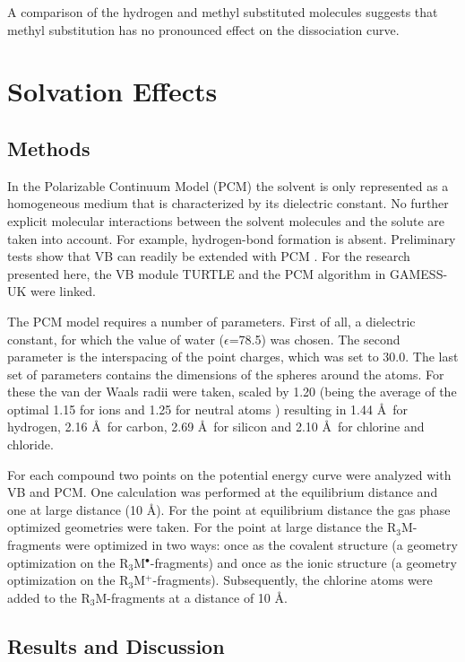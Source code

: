 A comparison of the hydrogen and methyl substituted molecules suggests that methyl substitution has no pronounced effect on the dissociation curve.  

\section{\label{ch3.sec.solv}Solvation Effects}

\subsection{Methods}

In the Polarizable Continuum Model (PCM) the solvent is only represented as a homogeneous medium that is characterized by its dielectric constant. No further explicit molecular interactions between the solvent molecules and the solute are taken into account. For example, hydrogen-bond formation is absent. Preliminary tests show that VB can readily be extended with PCM \cite{song}. For the research presented here, the VB module TURTLE and the PCM algorithm in GAMESS-UK were linked. 

The PCM model requires a number of parameters. First of all, a dielectric constant, for which the value of water ($\epsilon$=78.5) was chosen. The second parameter is the interspacing of the point charges, which was set to 30.0\degrees. The last set of parameters contains the dimensions of the spheres around the atoms. For these the van der Waals radii \cite{bondi} were taken, scaled by 1.20 (being the average of the optimal 1.15 for ions and 1.25 for neutral atoms \cite{scaling}) resulting in 1.44 \AA\  for hydrogen, 2.16 \AA\  for carbon, 2.69 \AA\ for silicon and 2.10 \AA\ for chlorine and chloride.

For each compound two points on the potential energy curve were analyzed with VB and PCM. One calculation was performed at the equilibrium distance and one at large distance (10 \AA). For the point at equilibrium distance the gas phase optimized geometries were taken. For the point at large distance the R$_3$M-fragments were optimized in two ways: once as the covalent structure (a geometry optimization on the R$_3$M$^\bullet$-fragments) and once as the ionic structure (a geometry optimization on the R$_3$M$^{+}$-fragments). Subsequently, the chlorine atoms were added to the R$_3$M-fragments at a distance of 10 \AA. 

\subsection{Results and Discussion}

